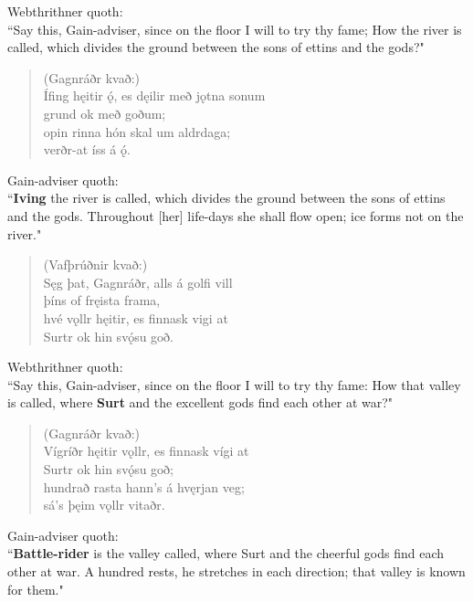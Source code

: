 \bvb Webthrithner quoth: \\ “Say this, Gain-adviser, since on the floor I will to try thy fame; How the river is called, which divides the ground between the sons of ettins and the gods?" \\

\begin{verse}
(Gagnráðr kvað:) \\%
\bva Ífing hęitir ǫ́, \hld es dęilir með jǫtna sonum \\%
\ind grund ok með goðum; \\%
opin rinna \hld hón skal um aldrdaga; \\%
\ind verðr-at íss á ǫ́.\\%
\end{verse}

\bvb Gain-adviser quoth: \\ “\textbf{Iving} the river is called, which divides the ground between the sons of ettins and the gods. Throughout [her] life-days she shall flow open; ice forms not on the river." \\

\begin{verse}
(Vafþrúðnir kvað:) \\%
\bva Sęg þat, Gagnráðr, \hld alls á golfi vill \\%
\ind þíns of fręista frama, \\%
hvé vǫllr hęitir, \hld es finnask vigi at \\%
\ind Surtr ok hin svǫ́su goð.\\%
\end{verse}

\bvb Webthrithner quoth: \\ “Say this, Gain-adviser, since on the floor I will to try thy fame: How that valley is called, where \textbf{Surt} and the excellent gods find each other at war?" \\

\begin{verse}
(Gagnráðr kvað:) \\%
\bva Vígríðr hęitir vǫllr, \hld es finnask vígi at \\%
\ind Surtr ok hin svǫ́su goð; \\%
hundrað rasta \hld hann's á hvęrjan veg; \\%
\ind sá's þęim vǫllr vitaðr.\\%
\end{verse}

\bvb Gain-adviser quoth: \\ “\textbf{Battle-rider} is the valley called, where Surt and the cheerful gods find each other at war. A hundred rests\footnotemark[30], he stretches in each direction; that valley is known for them.\footnotemark[31]" \\

